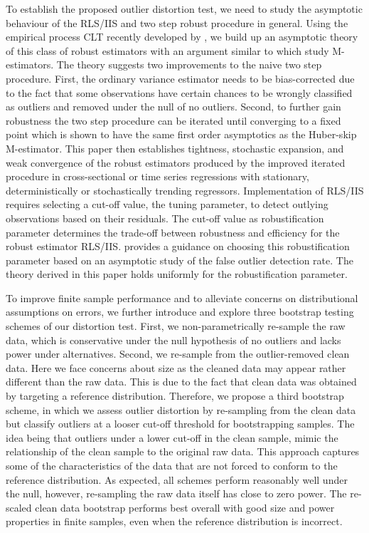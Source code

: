 \documentclass[11pt, letterpaper]{article}
\numberwithin{algorithm}{section}
\numberwithin{assumption}{section}
\numberwithin{lemma}{section}
\numberwithin{theorem}{section}
\numberwithin{corollary}{section}
\numberwithin{remark}{section}
\numberwithin{equation}{section}
\numberwithin{figure}{section}
\numberwithin{table}{section}
\begin{document}
To establish the proposed outlier distortion test, we need to study the asymptotic behaviour of the RLS/IIS and two step robust procedure in general. Using the empirical process CLT recently developed by \cite{berenguer2019analysis}, we build up an asymptotic theory of this class of robust estimators with an argument similar to \cite{johansen2009analysis, johansen2013outlier, johansen2019boundedness} which study M-estimators. The theory suggests two improvements to the naive two step procedure. First, the ordinary variance estimator needs to be bias-corrected due to the fact that some observations have certain chances to be wrongly classified as outliers and removed under the null of no outliers. Second, to further gain robustness the two step procedure can be iterated until converging to a fixed point which is shown to have the same first order asymptotics as the Huber-skip M-estimator. This paper then establishes tightness, stochastic expansion, and weak convergence of the robust estimators produced by the improved iterated procedure in cross-sectional or time series regressions with stationary, deterministically or stochastically trending regressors. Implementation of RLS/IIS requires selecting a cut-off value, the tuning parameter, to detect outlying observations based on their residuals. The cut-off value as robustification parameter determines the trade-off between robustness and efficiency for the robust estimator RLS/IIS. \cite{jiao2018testing} provides a guidance on choosing this robustification parameter based on an asymptotic study of the false outlier detection rate. The theory derived in this paper holds uniformly for the robustification parameter.

To improve finite sample performance and to alleviate concerns on distributional assumptions on errors, we further introduce and explore three bootstrap testing schemes of our distortion test. First, we non-parametrically re-sample the raw data, which is conservative under the null hypothesis of no outliers and lacks power under alternatives. Second, we re-sample from the outlier-removed clean data. Here we face concerns about size as the cleaned data may appear rather different than the raw data. This is due to the fact that clean data was obtained by targeting a reference distribution. Therefore, we propose a third bootstrap scheme, in which we assess outlier distortion by re-sampling from the clean data but classify outliers at a looser cut-off threshold for bootstrapping samples. The idea being that outliers under a lower cut-off in the clean sample, mimic the relationship of the clean sample to the original raw data. This approach captures some of the characteristics of the data that are not forced to conform to the reference distribution. As expected, all schemes perform reasonably well under the null, however, re-sampling the raw data itself has close to zero power. The re-scaled clean data bootstrap performs best overall with good size and power properties in finite samples, even when the reference distribution is incorrect.
\end{document}
